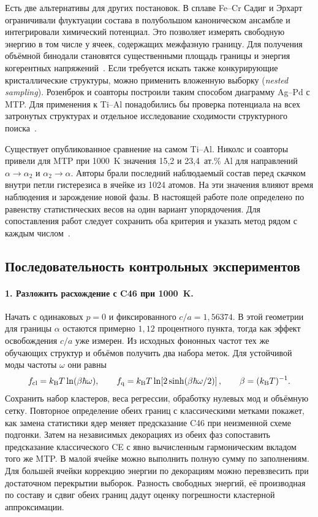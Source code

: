 \documentclass[11pt,a4paper]{article}
\begin{document}
Есть две альтернативы для других постановок. В сплаве Fe--Cr Садиг и Эрхарт
ограничивали флуктуации состава в полубольшом каноническом ансамбле и
интегрировали химический потенциал. Это позволяет измерять свободную энергию
в том числе у ячеек, содержащих межфазную границу. Для получения объёмной
бинодали становятся существенными площадь границы и энергия когерентных
напряжений~\cite{sadigh2012}. Если требуется искать также конкурирующие
кристаллические структуры, можно применить вложенную выборку
(\emph{nested sampling}). Розенброк и соавторы построили таким способом
диаграмму Ag--Pd с MTP. Для применения к Ti--Al понадобились бы проверка
потенциала на всех затронутых структурах и отдельное исследование
сходимости структурного поиска~\cite{rosenbrock2021}.

Существует опубликованное сравнение на самом Ti--Al. Николс и соавторы
привели для MTP при 1000~K значения 15,2 и 23,4~ат.\% Al
для направлений \(\alpha\to\alpha_2\) и \(\alpha_2\to\alpha\).
Авторы брали последний наблюдаемый состав перед скачком внутри петли
гистерезиса в ячейке из 1024 атомов. На эти значения влияют время
наблюдения и зарождение новой фазы. В настоящей работе поле определено
по равенству статистических весов на один вариант упорядочения.
Для сопоставления работ следует сохранить оба критерия и указать метод
рядом с каждым числом~\cite{nichols2026}.

\subsection{Последовательность контрольных экспериментов}

\paragraph{1. Разложить расхождение с C46 при 1000~K.}
Начать с одинаковых \(p=0\) и фиксированного \(c/a=1{,}56374\).
В этой геометрии для границы \(\alpha\) остаются примерно \(1{,}12\)
процентного пункта, тогда как эффект освобождения \(c/a\) уже измерен.
Из исходных фононных частот тех же обучающих структур и объёмов получить
два набора меток. Для устойчивой моды частоты \(\omega\) они равны
\[
 f_{\rm cl}=k_{\rm B}T\ln(\beta\hbar\omega),\qquad
 f_{\rm q}=k_{\rm B}T\ln\!\left[2\sinh(\beta\hbar\omega/2)\right],
 \qquad \beta=(k_{\rm B}T)^{-1}.
\]
Сохранить набор кластеров, веса регрессии, обработку нулевых мод и
объёмную сетку. Повторное определение обеих границ с классическими
метками покажет, как замена статистики ядер меняет предсказание C46 при
неизменной схеме подгонки. Затем на независимых декорациях из обеих фаз
сопоставить предсказание классического CE с явно вычисленным гармоническим
вкладом того же MTP. В малой ячейке можно выполнить полную сумму по
заполнениям. Для большей ячейки коррекцию энергии по декорациям можно
перевзвесить при достаточном перекрытии выборок. Разность свободных
энергий, её производная по составу и сдвиг обеих границ дадут оценку
погрешности кластерной аппроксимации.
\end{document}
